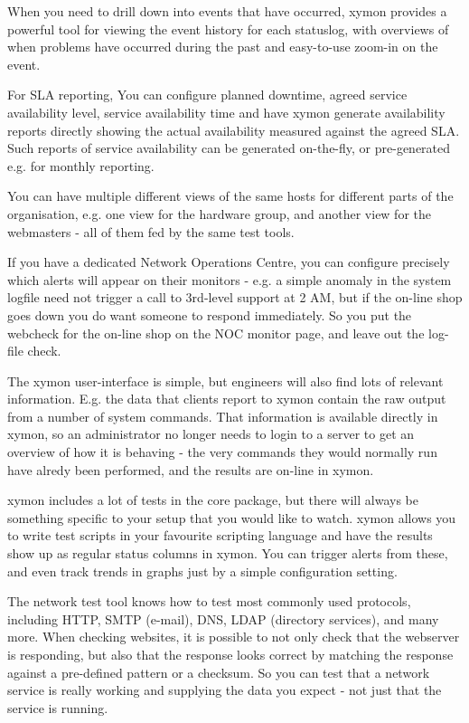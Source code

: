   When you need to drill down into events that have occurred, xymon
  provides a powerful tool for viewing the event history for each
  statuslog, with overviews of when problems have occurred during the
  past and easy-to-use zoom-in on the event. 

  For SLA reporting, You can configure planned downtime, agreed
  service availability level, service availability time and have
  xymon generate availability reports directly showing the actual
  availability measured against the agreed SLA. Such reports of
  service availability can be generated on-the-fly, or pre-generated
  e.g. for monthly reporting. 

\item[Role-based views] You can have multiple different views of the
  same hosts for different parts of the organisation, e.g. one view
  for the hardware group, and another view for the webmasters - all of
  them fed by the same test tools. 


  If you have a dedicated Network Operations Centre, you can configure
  precisely which alerts will appear on their monitors - e.g. a simple
  anomaly in the system logfile need not trigger a call to 3rd-level
  support at 2 AM, but if the on-line shop goes down you do want
  someone to respond immediately. So you put the webcheck for the
  on-line shop on the NOC monitor page, and leave out the log-file
  check. 
 

\item[Also for the techies] The xymon user-interface is simple, but
  engineers will also find lots of relevant information. E.g. the data
  that clients report to xymon contain the raw output from a number
  of system commands. That information is available directly in
  xymon, so an administrator no longer needs to login to a server to
  get an overview of how it is behaving - the very commands they would
  normally run have alredy been performed, and the results are on-line
  in xymon. 


\item[Easy to adapt to your needs] xymon includes a lot of tests in
  the core package, but there will always be something specific to
  your setup that you would like to watch. xymon allows you to write
  test scripts in your favourite scripting language and have the
  results show up as regular status columns in xymon. You can trigger
  alerts from these, and even track trends in graphs just by a simple
  configuration setting. 


\item[Real network service tests] The network test tool knows how to
  test most commonly used protocols, including HTTP, SMTP (e-mail),
  DNS, LDAP (directory services), and many more. When checking
  websites, it is possible to not only check that the webserver is
  responding, but also that the response looks correct by matching the
  response against a pre-defined pattern or a checksum. So you can
  test that a network service is really working and supplying the data
  you expect - not just that the service is running. 

